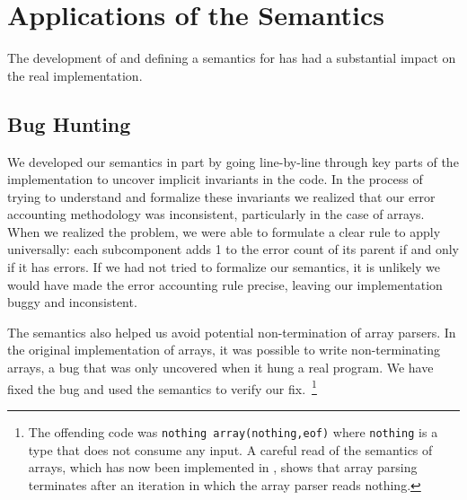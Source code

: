 \section{Applications of the Semantics}
\label{sec:applications}

The development of \ddc{} and defining a semantics for \ipads{}
has had a substantial impact on the real \pads{} implementation.



\subsection{Bug Hunting}

We developed our semantics in part by going line-by-line through
key parts of the \pads{} implementation to uncover implicit invariants in the
code.  In the process of trying to understand and formalize these
invariants we realized that our error accounting methodology was
inconsistent, particularly in the case of arrays.   When we realized
the problem, we were able to formulate a clear rule to apply universally:
each subcomponent adds 1 to the error count of its
parent if and only if it has errors.  If we had not tried to 
formalize our semantics, it is unlikely we would have made the
error accounting rule precise, leaving our implementation buggy 
and inconsistent.

The semantics also helped us avoid potential non-termination of
array parsers. In the original implementation of \pads{} arrays,
it was possible to write non-terminating arrays, a bug that was only uncovered
when it hung a real program.  We have fixed the bug and
used the semantics to verify our fix.~\footnote{The offending code
was {\tt nothing array(nothing,eof)} where {\tt nothing}
is a type that does not consume any input.  A careful read of
the \ddc{} semantics of arrays, which has now been implemented
in \pads{}, shows that array parsing terminates after an iteration
in which the array parser reads nothing.}



